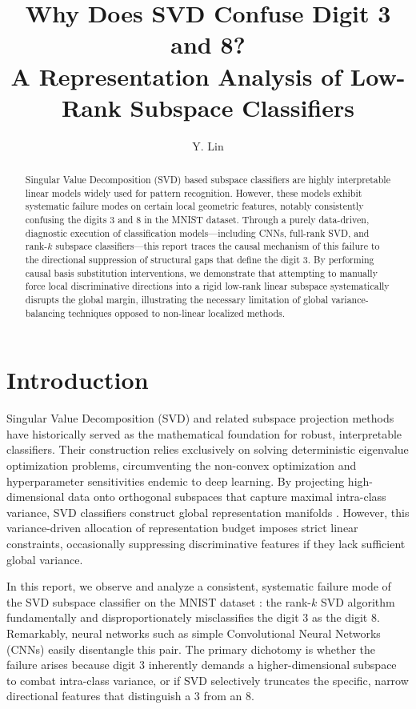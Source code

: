 \documentclass[11pt, a4paper]{article}
\title{Why Does SVD Confuse Digit 3 and 8?\\
       \large A Representation Analysis of Low-Rank Subspace Classifiers}
\author{Y. Lin}
\date{}
\begin{document}
\maketitle

\begin{abstract}
Singular Value Decomposition (SVD) based subspace classifiers are highly interpretable linear models widely used for pattern recognition. However, these models exhibit systematic failure modes on certain local geometric features, notably consistently confusing the digits 3 and 8 in the MNIST dataset. Through a purely data-driven, diagnostic execution of classification models—including CNNs, full-rank SVD, and rank-$k$ subspace classifiers—this report traces the causal mechanism of this failure to the directional suppression of structural gaps that define the digit 3. By performing causal basis substitution interventions, we demonstrate that attempting to manually force local discriminative directions into a rigid low-rank linear subspace systematically disrupts the global margin, illustrating the necessary limitation of global variance-balancing techniques opposed to non-linear localized methods.
\end{abstract}

\section{Introduction}

Singular Value Decomposition (SVD) and related subspace projection methods have historically served as the mathematical foundation for robust, interpretable classifiers. Their construction relies exclusively on solving deterministic eigenvalue optimization problems, circumventing the non-convex optimization and hyperparameter sensitivities endemic to deep learning. By projecting high-dimensional data onto orthogonal subspaces that capture maximal intra-class variance, SVD classifiers construct global representation manifolds \cite{turk1991eigenfaces}. However, this variance-driven allocation of representation budget imposes strict linear constraints, occasionally suppressing discriminative features if they lack sufficient global variance. 

In this report, we observe and analyze a consistent, systematic failure mode of the SVD subspace classifier on the MNIST dataset \cite{lecun1998gradient}: the rank-$k$ SVD algorithm fundamentally and disproportionately misclassifies the digit 3 as the digit 8. Remarkably, neural networks such as simple Convolutional Neural Networks (CNNs) \cite{paszke2019pytorch} easily disentangle this pair. The primary dichotomy is whether the failure arises because digit 3 inherently demands a higher-dimensional subspace to combat intra-class variance, or if SVD selectively truncates the specific, narrow directional features that distinguish a 3 from an 8. 
\end{document}
